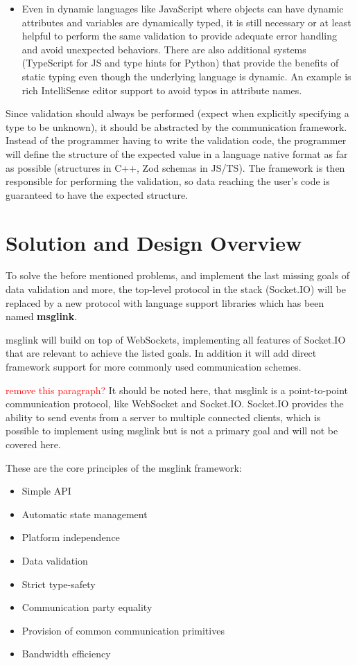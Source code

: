 \documentclass[conference]{IEEEtran}
\begin{document}
\begin{enumerate}
\begin{itemize}
        \item Even in dynamic languages like JavaScript where objects can have dynamic attributes and variables are dynamically typed, it is still necessary or at least helpful to perform the same validation to provide adequate error handling and avoid unexpected behaviors. There are also additional systems (TypeScript for JS and type hints for Python) that provide the benefits of static typing even though the underlying language is dynamic. An example is rich IntelliSense editor support to avoid typos in attribute names.
    \end{itemize}
    Since validation should always be performed (expect when explicitly specifying a type to be unknown), it should be abstracted by the communication framework. Instead of the programmer having to write the validation code, the programmer will define the structure of the expected value in a language native format as far as possible (structures in C++, Zod schemas in JS/TS). The framework is then responsible for performing the validation, so data reaching the user's code is guaranteed to have the expected structure.
\end{enumerate}


\section{Solution and Design Overview}

To solve the before mentioned problems, and implement the last missing goals of data validation and more, the top-level protocol in the stack (Socket.IO) will be replaced by a new protocol with language support libraries which has been named \textbf{msglink}.

msglink will build on top of WebSockets, implementing all features of Socket.IO that are relevant to achieve the listed goals. In addition it will add direct framework support for more commonly used communication schemes.

\textcolor{red}{remove this paragraph?}
It should be noted here, that msglink is a point-to-point communication protocol, like WebSocket and Socket.IO. Socket.IO provides the ability to send events from a server to multiple connected clients, which is possible to implement using msglink but is not a primary goal and will not be covered here.

These are the core principles of the msglink framework:

\begin{itemize}
    \item Simple API
    \item Automatic state management
    \item Platform independence
    \item Data validation
    \item Strict type-safety
    \item Communication party equality
    \item Provision of common communication primitives
    \item Bandwidth efficiency
\end{itemize}
\end{document}
